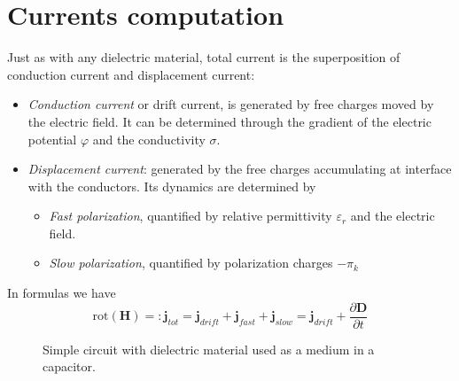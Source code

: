 \documentclass[11pt,a4paper]{article}
\begin{document}
\section{Currents computation}
Just as with any dielectric material, total current is the superposition of conduction current and displacement current:
\begin{itemize}
	\item \textit{Conduction current} or drift current, is generated by free charges moved by the electric field. It can be determined through the gradient of the electric potential \(\varphi\) and the conductivity \(\sigma\).
	\item \textit{Displacement current}: generated by the free charges accumulating at interface with the conductors. Its dynamics are determined by
	\begin{itemize}
		\item \textit{Fast polarization}, quantified by relative permittivity \(\varepsilon_{r}\) and the electric field.
		\item \textit{Slow polarization}, quantified by polarization charges \(-\pi_k\)
	\end{itemize}
\end{itemize}
In formulas we have
\begin{equation}
	\mathrm{rot}(\mathbf{H})=:\mathbf{j}_{tot} = \mathbf{j}_{drift} + \mathbf{j}_{fast} + \mathbf{j}_{slow} = \mathbf{j}_{drift} + \dfrac{\partial \mathbf{D}}{\partial t}
\end{equation}
\begin{figure}
	\centering
	\caption{Simple circuit with dielectric material used as a medium in a capacitor.}
	\label{fig:circuit}
\end{figure}
\end{document}
